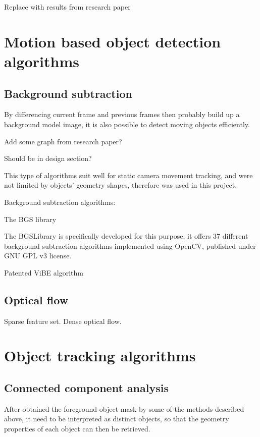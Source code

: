 {\color{red}Replace with results from research paper}

\section{Motion based object detection algorithms}

\subsection{Background subtraction}
\label{motion_bs}

By differencing current frame and previous frames then probably build up a background model image, it is also possible to detect moving objects efficiently.

{\color{red}Add some graph from research paper?}

{\color{red}Should be in design section?

This type of algorithms suit well for static camera movement tracking, and were not limited by objects' geometry shapes, therefore was used in this project.}

{\color{cyan}Background subtraction algorithms:

The BGS library

The BGSLibrary \cite{bgslibrary} is specifically developed for this purpose, it offers 37 different background subtraction algorithms implemented using OpenCV, published under GNU GPL v3 license.

Patented ViBE algorithm}

\subsection{Optical flow}

{\color{cyan}
Sparse feature set.
Dense optical flow.
}

\section{Object tracking algorithms}
\label{bg:tracking}

\subsection{Connected component analysis}
\label{blob}

After obtained the foreground object mask by some of the methods described above, it need to be interpreted as distinct objects, so that the geometry properties of each object can then be retrieved.

